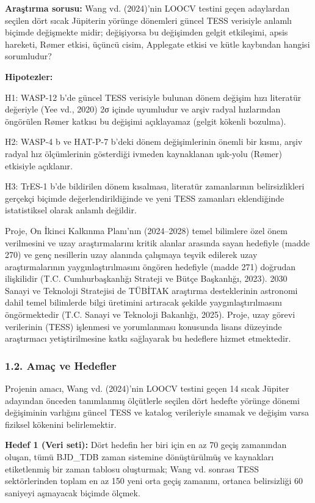 \textbf{Araştırma sorusu:} Wang vd. (2024)'nin LOOCV testini geçen adaylardan seçilen dört sıcak Jüpiterin yörünge dönemleri güncel TESS verisiyle anlamlı biçimde değişmekte midir; değişiyorsa bu değişimden gelgit etkileşimi, apsis hareketi, Rømer etkisi, üçüncü cisim, Applegate etkisi ve kütle kaybından hangisi sorumludur?

\textbf{Hipotezler:}

H1: WASP-12 b'de güncel TESS verisiyle bulunan dönem değişim hızı literatür değeriyle (Yee vd., 2020) 2σ içinde uyumludur ve arşiv radyal hızlarından öngörülen Rømer katkısı bu değişimi açıklayamaz (gelgit kökenli bozulma).

H2: WASP-4 b ve HAT-P-7 b'deki dönem değişimlerinin önemli bir kısmı, arşiv radyal hız ölçümlerinin gösterdiği ivmeden kaynaklanan ışık-yolu (Rømer) etkisiyle açıklanır.

H3: TrES-1 b'de bildirilen dönem kısalması, literatür zamanlarının belirsizlikleri gerçekçi biçimde değerlendirildiğinde ve yeni TESS zamanları eklendiğinde istatistiksel olarak anlamlı değildir.

Proje, On İkinci Kalkınma Planı'nın (2024–2028) temel bilimlere özel önem verilmesini ve uzay araştırmalarını kritik alanlar arasında sayan hedefiyle (madde 270) ve genç nesillerin uzay alanında çalışmaya teşvik edilerek uzay araştırmalarının yaygınlaştırılmasını öngören hedefiyle (madde 271) doğrudan ilişkilidir (T.C. Cumhurbaşkanlığı Strateji ve Bütçe Başkanlığı, 2023). 2030 Sanayi ve Teknoloji Stratejisi de TÜBİTAK araştırma desteklerinin astronomi dahil temel bilimlerde bilgi üretimini artıracak şekilde yaygınlaştırılmasını öngörmektedir (T.C. Sanayi ve Teknoloji Bakanlığı, 2025). Proje, uzay görevi verilerinin (TESS) işlenmesi ve yorumlanması konusunda lisans düzeyinde araştırmacı yetiştirilmesine katkı sağlayarak bu hedeflere hizmet etmektedir.

\subsubsection*{1.2. Amaç ve Hedefler}
Projenin amacı, Wang vd. (2024)'nin LOOCV testini geçen 14 sıcak Jüpiter adayından önceden tanımlanmış ölçütlerle seçilen dört hedefte yörünge dönemi değişiminin varlığını güncel TESS ve katalog verileriyle sınamak ve değişim varsa fiziksel kökenini belirlemektir.

\textbf{Hedef 1 (Veri seti):} Dört hedefin her biri için en az 70 geçiş zamanından oluşan, tümü BJD\_TDB zaman sistemine dönüştürülmüş ve kaynakları etiketlenmiş bir zaman tablosu oluşturmak; Wang vd. sonrası TESS sektörlerinden toplam en az 150 yeni orta geçiş zamanını, ortanca belirsizliği 60 saniyeyi aşmayacak biçimde ölçmek.

